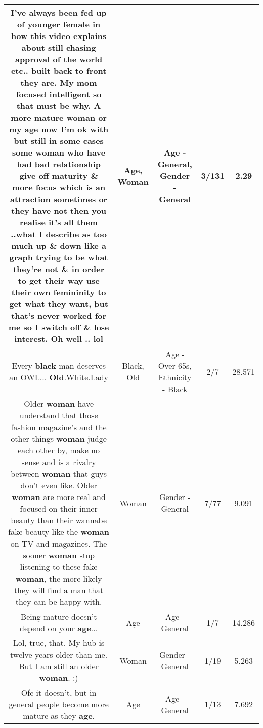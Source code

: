 \documentclass[11pt]{article}
\newlength\mylength
\begin{document}
\begin{center}
\begin{longtable}{|C{.65\mylength}|C{.30\mylength}|C{.12\mylength}|C{.12\mylength}|C{.12\mylength}|}
  \small I've always been fed up of younger  female in how this video explains about still chasing approval of the world etc.. built back to front they are. My mom focused intelligent so that must be why. A more mature \textbf{woman} or my \textbf{age} now I'm ok with but still in some cases some \textbf{woman} who have had bad relationship give off maturity \& more focus which is an attraction sometimes or they have not then you realise it's all them ..what I describe as too much up \& down like a graph trying to be what they're not \& in order to get their way use their own femininity to get what they want, but that's never worked for me so I switch off \& lose interest. Oh well .. lol\normalsize   & Age, Woman & Age - General, Gender - General & 3/131 & 2.29 \\  \hline
  \small Every \textbf{black} man deserves an OWL... \textbf{Old}.White.Lady\normalsize   & Black, Old & Age - Over 65s, Ethnicity - Black & 2/7 & 28.571 \\  \hline
  \small Older \textbf{woman} have understand that those fashion magazine's and the other things \textbf{woman} judge each other by, make no sense and is a rivalry between \textbf{woman} that guys don't even like. Older \textbf{woman} are more real and focused on their inner beauty than their wannabe fake beauty like the \textbf{woman} on TV and magazines. The sooner \textbf{woman} stop listening to these fake \textbf{woman}, the more likely they will find a man that they can be happy with.\normalsize   & Woman & Gender - General & 7/77 & 9.091 \\  \hline
  \small Being mature doesn't depend on your \textbf{age}...\normalsize   & Age & Age - General & 1/7 & 14.286 \\  \hline
  \small Lol, true, that. My hub is twelve years older than me. But I am still an older \textbf{woman}. :)\normalsize   & Woman & Gender - General & 1/19 & 5.263 \\  \hline
  \small Ofc it doesn't, but in general people become more mature as they \textbf{age}.\normalsize   & Age & Age - General & 1/13 & 7.692 \\  \hline

\end{longtable}
\end{center}
\end{document}
